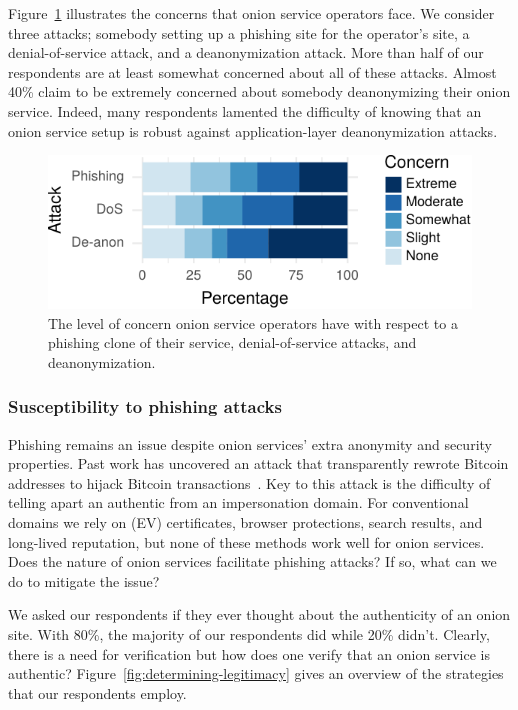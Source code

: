 Figure~\ref{fig:onion-operation-concerns} illustrates the concerns that onion
service operators face.  We consider three attacks; \first somebody setting up a
phishing site for the operator's site, \second a denial-of-service attack, and
\third a deanonymization attack.  More than half of our respondents are at least
somewhat concerned about all of these attacks.  Almost 40\% claim to be
extremely concerned about somebody deanonymizing their onion service.  Indeed,
many respondents lamented the difficulty of knowing that an onion service setup
is robust against application-layer deanonymization attacks.

\begin{figure}[t]
    \centering
    \includegraphics[width=\linewidth]{figures/onion-operation-concerns.pdf}
    \caption{The level of concern onion service operators have with respect to a
    phishing clone of their service, denial-of-service attacks, and
    deanonymization.}
    \label{fig:onion-operation-concerns}
\end{figure}

\subsubsection{Susceptibility to phishing attacks}

Phishing remains an issue despite onion services' extra anonymity and security
properties.  Past work has uncovered an attack that transparently rewrote
Bitcoin addresses to hijack Bitcoin
transactions~\cite{Winter2016a,Nurmi2015a,Monteiro2016a}.  Key to this attack is
the difficulty of telling apart an authentic from an impersonation domain.  For
conventional domains we rely on (EV) certificates, browser protections, search
results, and long-lived reputation, but none of these methods work well for
onion services.  Does the nature of onion services facilitate phishing attacks?
If so, what can we do to mitigate the issue?

We asked our respondents if they ever thought about the authenticity of an onion
site.  With 80\%, the majority of our respondents did while 20\% didn't.
Clearly, there is a need for verification but how does one verify that an onion
service is authentic?  Figure~\ref{fig:determining-legitimacy} gives an overview
of the strategies that our respondents employ.

